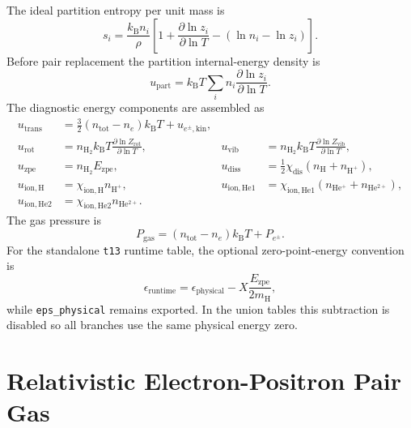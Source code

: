 \documentclass[11pt]{article}
\newcommand{\kb}{k_{\mathrm B}}
\newcommand{\mh}{m_{\mathrm H}}
\newcommand{\eps}{\epsilon}
\begin{document}
The ideal partition entropy per unit mass is
\begin{equation}
  s_i=\frac{\kb n_i}{\rho}
  \left[1+\frac{\partial\ln z_i}{\partial\ln T}
  -\left(\ln n_i-\ln z_i\right)\right].
\end{equation}
Before pair replacement the partition internal-energy density is
\begin{equation}
  u_{\mathrm{part}} =
  \kb T\sum_i n_i\frac{\partial\ln z_i}{\partial\ln T}.
\end{equation}
The diagnostic energy components are assembled as
\begin{align}
  u_{\mathrm{trans}} &= \frac{3}{2}(n_{\mathrm{tot}}-n_e)\kb T
                       + u_{e^\pm,\mathrm{kin}},
\\
  u_{\mathrm{rot}} &= n_{\mathrm{H_2}}\kb T
    \frac{\partial\ln Z_{\mathrm{rot}}}{\partial\ln T},
&
  u_{\mathrm{vib}} &= n_{\mathrm{H_2}}\kb T
    \frac{\partial\ln Z_{\mathrm{vib}}}{\partial\ln T},
\\
  u_{\mathrm{zpe}} &= n_{\mathrm{H_2}}E_{\mathrm{zpe}},
&
  u_{\mathrm{diss}} &= \frac{1}{2}\chi_{\mathrm{dis}}
    (n_{\mathrm H}+n_{\mathrm{H^+}}),
\\
  u_{\mathrm{ion,H}} &= \chi_{\mathrm{ion,H}}n_{\mathrm{H^+}},
&
  u_{\mathrm{ion,He1}} &=
    \chi_{\mathrm{ion,He1}}(n_{\mathrm{He^+}}+n_{\mathrm{He^{2+}}}),
\\
  u_{\mathrm{ion,He2}} &= \chi_{\mathrm{ion,He2}}n_{\mathrm{He^{2+}}}.
\end{align}
The gas pressure is
\begin{equation}
  P_{\mathrm{gas}}=(n_{\mathrm{tot}}-n_e)\kb T+P_{e^\pm}.
\end{equation}
For the standalone \texttt{t13} runtime table, the optional zero-point-energy
convention is
\begin{equation}
  \eps_{\mathrm{runtime}} =
  \eps_{\mathrm{physical}} -
  X\frac{E_{\mathrm{zpe}}}{2\mh},
\end{equation}
while \texttt{eps\_physical} remains exported.  In the union tables this
subtraction is disabled so all branches use the same physical energy zero.

\section{Relativistic Electron-Positron Pair Gas}
\end{document}
